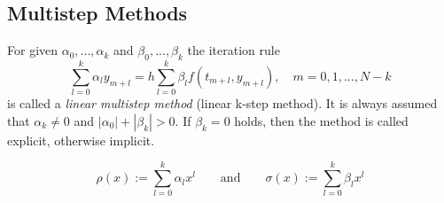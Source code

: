 	
	\subsection{Multistep Methods}
	\begin{frame}
		\vfill
		\begin{definition}
			\label{def:multi step method}
			For given $\alpha_0, ..., \alpha_k$ and $\beta_0, ..., \beta_k$ the iteration rule
			\begin{equation}
				\label{linear-multistep-method}
				\sum_{l=0}^{k} \alpha_l y_{m+l} = h \sum_{l=0}^{k} \beta_l f(t_{m+l}, y_{m+l}), \quad m=0,1,...,N-k
			\end{equation}
			is called a \emph{linear multistep method} (linear k-step method). It is always assumed that $\alpha_k \neq 0$ and $|\alpha_0| + |\beta_k| > 0$. If $\beta_k=0$ holds, then the method is called explicit, otherwise implicit.
		\end{definition}
		\begin{definition}
			\begin{equation*}
				\label{eq:generating polynomials multistep method}
				\rho(x) := \sum_{l=0}^{k} \alpha_l x^l
				\qquad \text{and} \qquad
				\sigma(x) := \sum_{l=0}^{k} \beta_l x^l
			\end{equation*}
		\end{definition}
		\vfill
	\end{frame}
	
